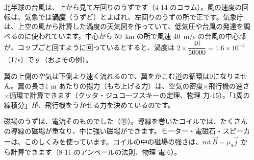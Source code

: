 \begin{butsuri}
\noindent\begin{minipage}[c]{0.70\linewidth}
\raggedright
北半球の台風は、上から見て左回りのうずです（4-14 のコラム）。風の速度の回転は、気象では\textbf{渦度}（うずど）とよばれ、左回りのうずの所で正です。気象庁は、上空の風から計算した渦度の天気図を作っていて、低気圧や台風の発達を調べるのに使われています。中心から \qty{50}{km} の所で風速 \qty{40}{m/s} の台風の中心部が、コップごと回すように回っているとすると、渦度は $2\times\dfrac{40}{\num{50000}}=1.6\times10^{-3}$〔1/s〕です（およその例）。
\end{minipage}\hfill
\begin{minipage}[c]{0.27\linewidth}
\centering
{}
\end{minipage}
\par\vspace{4pt}
翼の上側の空気は下側より速く流れるので、翼をかこむ道の循環は0になりません。翼の長さ1 m あたりの揚力（もち上げる力）は、空気の密度×飛行機の速さ×循環で計算できます（クッタ・ジュコーフスキーの定理、物理 力-15）。「1周の線積分」が、飛行機をうかせる力を決めているのです。
\par\vspace{4pt}
\noindent\begin{minipage}[c]{0.70\linewidth}
\raggedright
磁場のうずは、電流そのものでした（⑪）。導線を巻いたコイルでは、たくさんの導線の磁場が重なり、中に強い磁場ができます。モーター・電磁石・スピーカーは、このしくみを使っています。コイルの中の磁場の強さは、$\mathrm{rot}\,\vec B=\mu_0\vec j$ から計算できます（8-11 のアンペールの法則、物理 電-6）。
\end{minipage}\hfill
\begin{minipage}[c]{0.27\linewidth}
\centering
{}
\end{minipage}
\end{butsuri}



